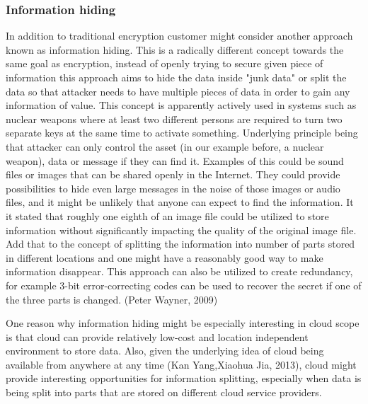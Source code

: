 \documentclass{article}
\begin{document}
\subsubsection{Information hiding}
In addition to traditional encryption customer might consider another approach known as information hiding. This is a radically different concept towards the same goal as encryption, instead of openly trying to secure given piece of information this approach aims to hide the data inside "junk data" or split the data so that attacker needs to have multiple pieces of data in order to gain any information of value. This concept is apparently actively used in systems such as nuclear weapons where at least two different persons are required to turn two separate keys at the same time to activate something. Underlying principle being that attacker can only control the asset (in our example before, a nuclear weapon), data or message if they can find it. Examples of this could be sound files or images that can be shared openly in the Internet. They could provide possibilities to hide even large messages in the noise of those images or audio files, and it might be unlikely that anyone can expect to find the information. It it stated that roughly one eighth of an image file could be utilized to store information without significantly impacting the quality of the original image file. Add that to the concept of splitting the information into number of parts stored in different locations and one might have a reasonably good way to make information disappear. This approach can also be utilized to create redundancy, for example 3-bit error-correcting codes can be used to recover the secret if one of the three parts is changed. (Peter Wayner, 2009)
\par
One reason why information hiding might be especially interesting in cloud scope is that cloud can provide relatively low-cost and location independent environment to store data. Also, given the underlying idea of cloud being available from anywhere at any time (Kan Yang,Xiaohua Jia, 2013), cloud might provide interesting opportunities for information splitting, especially when data is being split into parts that are stored on different cloud service providers.
\end{document}
